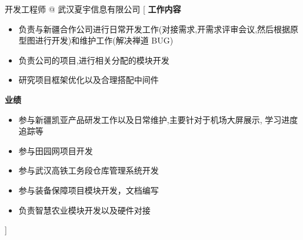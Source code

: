 \documentclass[zh]{resume}
\begin{document}
\begin{experiences}
	{开发工程师 @ 武汉夏宇信息有限公司 }%
	[
    {\textbf{工作内容}}
      \begin{itemize}
        \item 负责与新疆合作公司进行日常开发工作(对接需求,开需求评审会议,然后根据原型图进行开发)和维护工作(解决禅道 BUG)
        \item 负责公司的项目,进行相关分配的模块开发
        \item 研究项目框架优化以及合理搭配中间件
      \end{itemize}
    {\textbf{业绩}}
      \begin{itemize}
        \item 参与新疆凯亚产品研发工作以及日常维护,主要针对于机场大屏展示, 学习进度追踪等
        \item 参与田园网项目开发
        \item 参与武汉高铁工务段仓库管理系统开发
        \item 参与装备保障项目模块开发，文档编写
        \item 负责智慧农业模块开发以及硬件对接
      \end{itemize}
  ]

	\separator{0.5ex}
\end{experiences}

\newpage
{}
\end{document}
